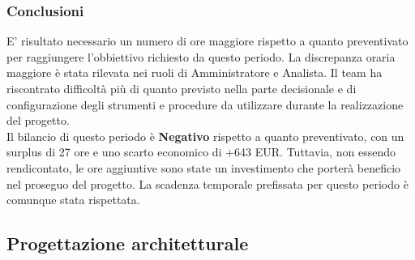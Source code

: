 \subsubsection{Conclusioni}
E' risultato necessario un numero di ore maggiore rispetto a quanto preventivato per raggiungere l'obbiettivo richiesto da questo periodo. La discrepanza oraria maggiore è stata rilevata nei ruoli di Amministratore e Analista. Il team ha riscontrato difficoltà più di quanto previsto nella parte decisionale e di configurazione degli strumenti e procedure da utilizzare durante la realizzazione del progetto.
\\Il bilancio di questo periodo è \textbf{Negativo} rispetto a quanto preventivato, con un surplus di 27 ore e uno scarto economico di +643 EUR. Tuttavia, non essendo rendicontato, le ore aggiuntive sono state un investimento che porterà beneficio nel proseguo del progetto. La scadenza temporale prefissata per questo periodo è comunque stata rispettata.

\newpage
\subsection{Progettazione architetturale}
